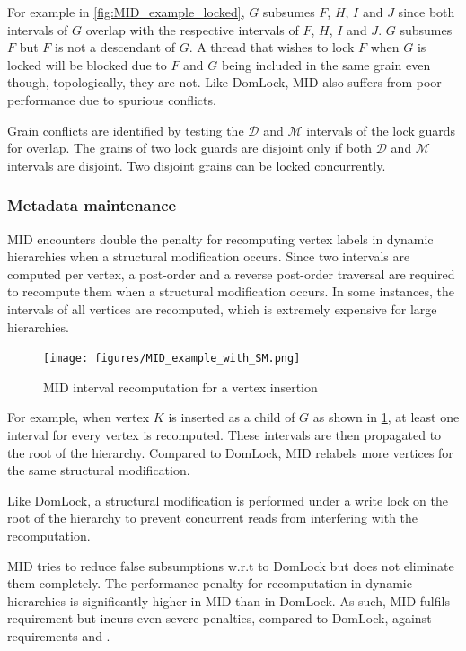 For example in \cref{fig:MID_example_locked}, $G$ subsumes $F$, $H$, $I$ and $J$ since both intervals of $G$ overlap with the respective intervals of $F$, $H$, $I$ and $J$. $G$ subsumes $F$ but $F$ is not a descendant of $G$. A thread that wishes to lock $F$ when $G$ is locked will be blocked due to $F$ and $G$ being included in the same grain even though, topologically, they are not. Like DomLock, MID also suffers from poor performance due to spurious conflicts.

Grain conflicts are identified by testing the $\mathcal{D}$ and $\mathcal{M}$ intervals of the lock guards for overlap. The grains of two lock guards are disjoint only if both $\mathcal{D}$ and $\mathcal{M}$ intervals are disjoint. Two disjoint grains can be locked concurrently. 

\subsubsection{Metadata maintenance}

MID encounters double the penalty for recomputing vertex labels in dynamic hierarchies when a structural modification occurs. Since two intervals are computed per vertex, a post-order and a reverse post-order traversal are required to recompute them when a structural modification occurs. In some instances, the intervals of all vertices are recomputed, which is extremely expensive for large hierarchies.

\begin{figure}[H]
    \centering
    \captionsetup{justification=centering}
    \texttt{[image: figures/MID\_example\_with\_SM.png]}
    \caption{MID interval recomputation for a vertex insertion}
    \label{fig:MID_example_SM}
    
\end{figure}

For example, when vertex $K$ is inserted as a child of $G$ as shown in \cref{fig:MID_example_SM}, at least one interval for every vertex is recomputed. These intervals are then propagated to the root of the hierarchy. Compared to DomLock, MID relabels more vertices for the same structural modification. 


Like DomLock, a structural modification is performed under a write lock on the root of the hierarchy to prevent concurrent reads from interfering with the recomputation.


MID tries to reduce false subsumptions w.r.t to DomLock but does not eliminate them completely. The performance penalty for recomputation in dynamic hierarchies is significantly higher in MID than in DomLock. As such, MID fulfils requirement \Rb but incurs even severe penalties, compared to DomLock, against requirements \Rc and \Rd.

